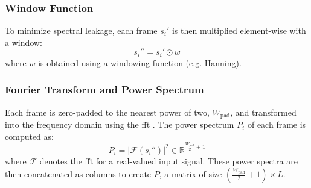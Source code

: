 \subsubsection{Window Function}
To minimize spectral leakage, each frame \({s}_i'\) is then multiplied element-wise with a window:
\begin{equation}
{s}_i'' = {s}_i' \odot {w}
\end{equation}
where \({w}\) is obtained using a windowing function (e.g. Hanning).


\subsubsection{Fourier Transform and Power Spectrum}
Each frame is zero-padded to the nearest power of two, \(W_{\text{pad}}\), and transformed into the frequency domain using the \gls{fft} \cite{Cooley1965}. The power spectrum \({P}_i\) of each frame is computed as:
\begin{equation}
\label{eq:power_spectrum} 
{P}_i = \left| \mathscr{F}({s}_i'') \right|^2 \in \mathbb{R}^{\frac{W_{\text{pad}}}{2}+1}
\end{equation}
where \(\mathscr{F}\) denotes the \gls{fft} for a real-valued input signal. These power spectra are then concatenated as columns to create ${P}$, a matrix of size $\left( \frac{W_{\text{pad}}}{2}+1 \right) \times L$.

